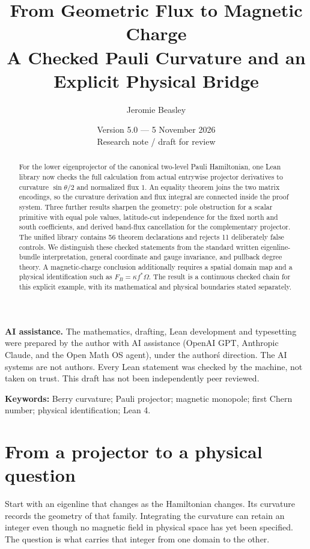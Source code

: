 \documentclass[11pt]{article}
\title{\vspace{-1.5em}From Geometric Flux to Magnetic Charge\\[0.4em]\large A Checked Pauli Curvature and an Explicit Physical Bridge}
\author{Jeromie Beasley}
\date{Version 5.0 --- 5 November 2026\\\small Research note / draft for review}
\theoremstyle{definition}\newtheorem{definition}[theorem]{Definition}
\theoremstyle{remark}\newtheorem{remark}[theorem]{Remark}
\begin{document}
\maketitle
{\small\noindent\textbf{AI assistance.} The mathematics, drafting, Lean development and typesetting were prepared by the author with AI assistance (OpenAI GPT, Anthropic Claude, and the Open Math OS agent), under the author\'s direction. The AI systems are not authors. Every Lean statement was checked by the machine, not taken on trust. This draft has not been independently peer reviewed.\par}
\begin{abstract}
For the lower eigenprojector of the canonical two-level Pauli Hamiltonian, one Lean library now checks the full calculation from actual entrywise projector derivatives to curvature $\sin\theta/2$ and normalized flux $1$. An equality theorem joins the two matrix encodings, so the curvature derivation and flux integral are connected inside the proof system. Three further results sharpen the geometry: pole obstruction for a scalar primitive with equal pole values, latitude-cut independence for the fixed north and south coefficients, and derived band-flux cancellation for the complementary projector. The unified library contains 56 theorem declarations and rejects 11 deliberately false controls. We distinguish these checked statements from the standard written eigenline-bundle interpretation, general coordinate and gauge invariance, and pullback degree theory. A magnetic-charge conclusion additionally requires a spatial domain map and a physical identification such as $F_B=\kappa f^*\Omega$. The result is a continuous checked chain for this explicit example, with its mathematical and physical boundaries stated separately.

\end{abstract}
\noindent\textbf{Keywords:} Berry curvature; Pauli projector; magnetic monopole; first Chern number; physical identification; Lean 4.

\section{From a projector to a physical question}
Start with an eigenline that changes as the Hamiltonian changes. Its curvature records the geometry of that family. Integrating the curvature can retain an integer even though no magnetic field in physical space has yet been specified. The question is what carries that integer from one domain to the other.
\end{document}
